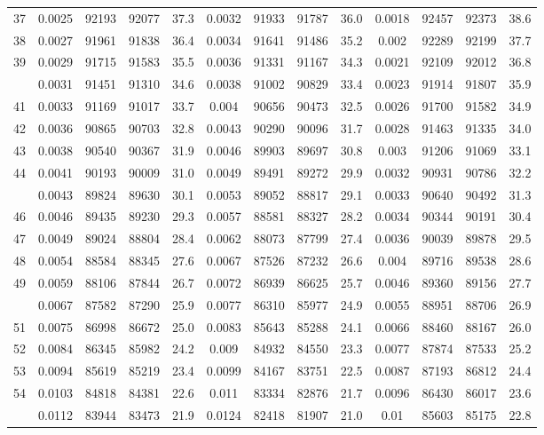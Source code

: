 \documentclass[
  14pt,
]{article}
\begin{document}
\begin{longtable}[t]{lcccccccccccc}
37 & 0.0025 & 92193 & 92077 & 37.3 & 0.0032 & 91933 & 91787 & 36.0 & 0.0018 & 92457 & 92373 & 38.6\\
38 & 0.0027 & 91961 & 91838 & 36.4 & 0.0034 & 91641 & 91486 & 35.2 & 0.002 & 92289 & 92199 & 37.7\\
39 & 0.0029 & 91715 & 91583 & 35.5 & 0.0036 & 91331 & 91167 & 34.3 & 0.0021 & 92109 & 92012 & 36.8\\
\addlinespace
40 & 0.0031 & 91451 & 91310 & 34.6 & 0.0038 & 91002 & 90829 & 33.4 & 0.0023 & 91914 & 91807 & 35.9\\
41 & 0.0033 & 91169 & 91017 & 33.7 & 0.004 & 90656 & 90473 & 32.5 & 0.0026 & 91700 & 91582 & 34.9\\
42 & 0.0036 & 90865 & 90703 & 32.8 & 0.0043 & 90290 & 90096 & 31.7 & 0.0028 & 91463 & 91335 & 34.0\\
43 & 0.0038 & 90540 & 90367 & 31.9 & 0.0046 & 89903 & 89697 & 30.8 & 0.003 & 91206 & 91069 & 33.1\\
44 & 0.0041 & 90193 & 90009 & 31.0 & 0.0049 & 89491 & 89272 & 29.9 & 0.0032 & 90931 & 90786 & 32.2\\
\addlinespace
45 & 0.0043 & 89824 & 89630 & 30.1 & 0.0053 & 89052 & 88817 & 29.1 & 0.0033 & 90640 & 90492 & 31.3\\
46 & 0.0046 & 89435 & 89230 & 29.3 & 0.0057 & 88581 & 88327 & 28.2 & 0.0034 & 90344 & 90191 & 30.4\\
47 & 0.0049 & 89024 & 88804 & 28.4 & 0.0062 & 88073 & 87799 & 27.4 & 0.0036 & 90039 & 89878 & 29.5\\
48 & 0.0054 & 88584 & 88345 & 27.6 & 0.0067 & 87526 & 87232 & 26.6 & 0.004 & 89716 & 89538 & 28.6\\
49 & 0.0059 & 88106 & 87844 & 26.7 & 0.0072 & 86939 & 86625 & 25.7 & 0.0046 & 89360 & 89156 & 27.7\\
\addlinespace
50 & 0.0067 & 87582 & 87290 & 25.9 & 0.0077 & 86310 & 85977 & 24.9 & 0.0055 & 88951 & 88706 & 26.9\\
51 & 0.0075 & 86998 & 86672 & 25.0 & 0.0083 & 85643 & 85288 & 24.1 & 0.0066 & 88460 & 88167 & 26.0\\
52 & 0.0084 & 86345 & 85982 & 24.2 & 0.009 & 84932 & 84550 & 23.3 & 0.0077 & 87874 & 87533 & 25.2\\
53 & 0.0094 & 85619 & 85219 & 23.4 & 0.0099 & 84167 & 83751 & 22.5 & 0.0087 & 87193 & 86812 & 24.4\\
54 & 0.0103 & 84818 & 84381 & 22.6 & 0.011 & 83334 & 82876 & 21.7 & 0.0096 & 86430 & 86017 & 23.6\\
\addlinespace
55 & 0.0112 & 83944 & 83473 & 21.9 & 0.0124 & 82418 & 81907 & 21.0 & 0.01 & 85603 & 85175 & 22.8\\

\end{longtable}
\end{document}
